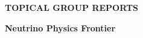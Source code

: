 

  \vfill

\begin{center}
\begin{Huge}   {\bf  TOPICAL GROUP REPORTS}

\bigskip

\bigskip


 {\bf Neutrino Physics Frontier }

\vfill

\vfill

\end{Huge}
\end{center}

\newpage
\thispagestyle{empty}
\mbox{\null}


